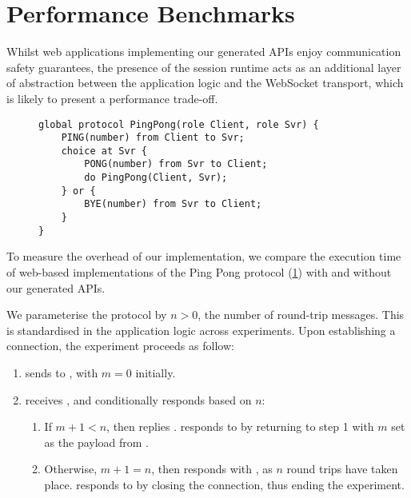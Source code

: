 \section{Performance Benchmarks}

Whilst web applications implementing our generated APIs enjoy
communication safety guarantees, the presence of the session runtime acts
as an additional layer of abstraction between the application logic and the
WebSocket transport, which is likely to present a performance trade-off.

\begin{figure}[!ht]
\begin{lstlisting}[language=Scribble]
global protocol PingPong(role Client, role Svr) {
	PING(number) from Client to Svr;
	choice at Svr {
		PONG(number) from Svr to Client;
		do PingPong(Client, Svr);
	} or {
		BYE(number) from Svr to Client;	
	}
}
\end{lstlisting}
\label{lst:pingpong}
\end{figure}

To measure the overhead of our implementation, we compare the
execution time of web-based implementations of the
Ping Pong protocol (\cref{lst:pingpong}) with and without
our generated APIs.

We parameterise the  protocol by $n > 0$, the number of
round-trip messages. This is standardised in the application logic
across experiments.
Upon establishing a connection, the experiment proceeds as follow:

\begin{enumerate}

\item {} sends  to , 
with $m = 0$ initially.

\item {} receives , and
conditionally responds based on $n$:

\begin{enumerate}
\item If $m + 1 < n$, then  replies .
 responds to  by returning to
step 1 with $m$ set as the payload from .

\item Otherwise, $m + 1 = n$, then  responds with 
, as $n$ round trips have taken place. 
 responds to  by 
closing the connection, thus ending the experiment.
\end{enumerate}

\end{enumerate}

